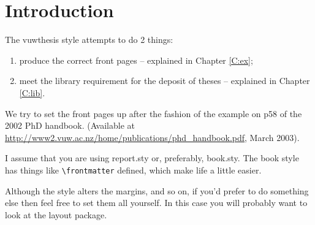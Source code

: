 
\chapter{Introduction}\label{C:intro}
The \textsf{vuwthesis} style attempts to do 2 things:
\begin{enumerate}
\item produce the correct front pages -- explained in Chapter \ref{C:ex};
\item meet the library requirement for the deposit of theses -- explained in Chapter \ref{C:lib}.
\end{enumerate}

We try to set the front pages up after the fashion of the example on p58
of the 2002 PhD handbook. (Available at
\url{http://www2.vuw.ac.nz/home/publications/phd_handbook.pdf}, March
2003).

I assume that you are using \textsf{report.sty} or, preferably,
\textsf{book.sty}. The book style has things like \verb+\frontmatter+
defined, which make life a little easier. 

Although the style alters the margins, and so on,  if you'd prefer to do
something else then feel free to set them all yourself. In this case you
will probably want to look at the \textsf{layout} package.
